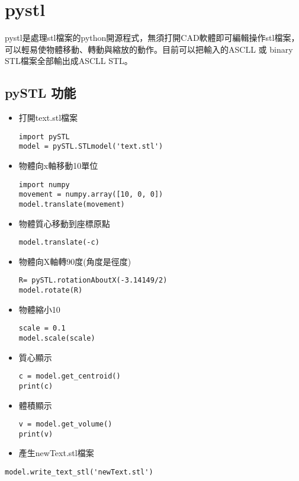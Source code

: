 \chapter{pystl}
 pystl是處理stl檔案的python開源程式，無須打開CAD軟體即可編輯操作stl檔案，可以輕易使物體移動、轉動與縮放的動作。目前可以把輸入的ASCLL 或 binary STL檔案全部輸出成ASCLL STL。\\
 

\section{pySTL 功能}
\begin{itemize}
\item 打開text.stl檔案
\begin{lstlisting}[caption=\Large 輸入檔案]
import pySTL
model = pySTL.STLmodel('text.stl')

\end{lstlisting}
 
\item 物體向x軸移動10單位
 \begin{lstlisting}[caption=\Large 移動]
import numpy
movement = numpy.array([10, 0, 0])
model.translate(movement)

\end{lstlisting}

\item 物體質心移動到座標原點
 \begin{lstlisting}[caption=\Large 移動]
model.translate(-c)

\end{lstlisting}

\item 物體向X軸轉90度(角度是徑度)
 \begin{lstlisting}[caption=\Large 轉動]
R= pySTL.rotationAboutX(-3.14149/2)
model.rotate(R)

\end{lstlisting}

\item 物體縮小10%
 \begin{lstlisting}[caption=\Large 縮放]
scale = 0.1
model.scale(scale)

\end{lstlisting}


\item 質心顯示
 \begin{lstlisting}[caption=\Large 數值]
c = model.get_centroid()
print(c)

\end{lstlisting}

\item 體積顯示
 \begin{lstlisting}[caption=\Large 數值]
v = model.get_volume()
print(v)

\end{lstlisting}

\item 產生newText.stl檔案
\end{itemize}
 \begin{lstlisting}[caption=\Large 產生新stl檔案]
model.write_text_stl('newText.stl')
\end{lstlisting}

